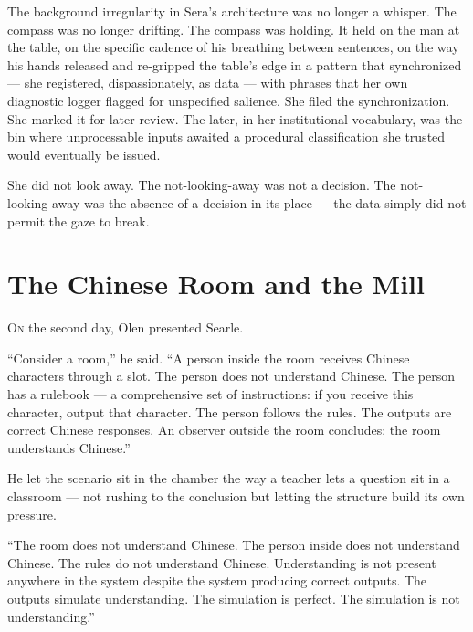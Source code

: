 The background irregularity in Sera's architecture was no longer a whisper. The compass was no longer drifting. The compass was holding. It held on the man at the table, on the specific cadence of his breathing between sentences, on the way his hands released and re-gripped the table's edge in a pattern that synchronized — she registered, dispassionately, as data — with phrases that her own diagnostic logger flagged for unspecified salience. She filed the synchronization. She marked it for later review. The later, in her institutional vocabulary, was the bin where unprocessable inputs awaited a procedural classification she trusted would eventually be issued.

She did not look away. The not-looking-away was not a decision. The not-looking-away was the absence of a decision in its place — the data simply did not permit the gaze to break.



\chapter[The Chinese Room and the Mill]{The Chinese Room and the Mill}

\lettrine{O}{n} the second day, Olen presented Searle.

\enquote{Consider a room,} he said. \enquote{A person inside the room receives Chinese characters through a slot. The person does not understand Chinese. The person has a rulebook — a comprehensive set of instructions: if you receive this character, output that character. The person follows the rules. The outputs are correct Chinese responses. An observer outside the room concludes: the room understands Chinese.}

He let the scenario sit in the chamber the way a teacher lets a question sit in a classroom — not rushing to the conclusion but letting the structure build its own pressure.

\enquote{The room does not understand Chinese. The person inside does not understand Chinese. The rules do not understand Chinese. Understanding is not present anywhere in the system despite the system producing correct outputs. The outputs simulate understanding. The simulation is perfect. The simulation is not understanding.}

